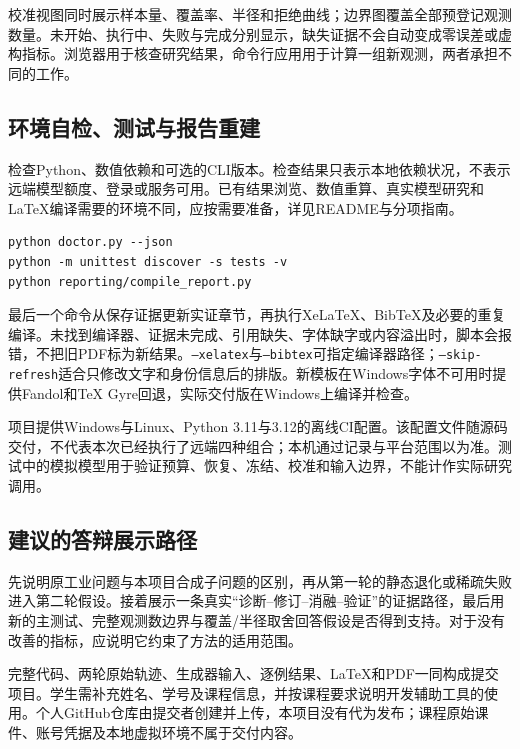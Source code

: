 校准视图同时展示样本量、覆盖率、半径和拒绝曲线；边界图覆盖全部预登记观测数量。未开始、执行中、失败与完成分别显示，缺失证据不会自动变成零误差或虚构指标。浏览器用于核查研究结果，命令行应用用于计算一组新观测，两者承担不同的工作。

\subsection{环境自检、测试与报告重建}
检查Python、数值依赖和可选的CLI版本。检查结果只表示本地依赖状况，不表示远端模型额度、登录或服务可用。已有结果浏览、数值重算、真实模型研究和LaTeX编译需要的环境不同，应按需要准备，详见README与分项指南。

\begin{lstlisting}
python doctor.py --json
python -m unittest discover -s tests -v
python reporting/compile_report.py
\end{lstlisting}
最后一个命令从保存证据更新实证章节，再执行XeLaTeX、BibTeX及必要的重复编译。未找到编译器、证据未完成、引用缺失、字体缺字或内容溢出时，脚本会报错，不把旧PDF标为新结果。\texttt{--xelatex}与\texttt{--bibtex}可指定编译器路径；\texttt{--skip-refresh}适合只修改文字和身份信息后的排版。新模板在Windows字体不可用时提供Fandol和TeX Gyre回退，实际交付版在Windows上编译并检查。

项目提供Windows与Linux、Python 3.11与3.12的离线CI配置。该配置文件随源码交付，不代表本次已经执行了远端四种组合；本机通过记录与平台范围以为准。测试中的模拟模型用于验证预算、恢复、冻结、校准和输入边界，不能计作实际研究调用。

\subsection{建议的答辩展示路径}
先说明原工业问题与本项目合成子问题的区别，再从第一轮的静态退化或稀疏失败进入第二轮假设。接着展示一条真实“诊断--修订--消融--验证”的证据路径，最后用新的主测试、完整观测数边界与覆盖/半径取舍回答假设是否得到支持。对于没有改善的指标，应说明它约束了方法的适用范围。

完整代码、两轮原始轨迹、生成器输入、逐例结果、LaTeX和PDF一同构成提交项目。学生需补充姓名、学号及课程信息，并按课程要求说明开发辅助工具的使用。个人GitHub仓库由提交者创建并上传，本项目没有代为发布；课程原始课件、账号凭据及本地虚拟环境不属于交付内容。

